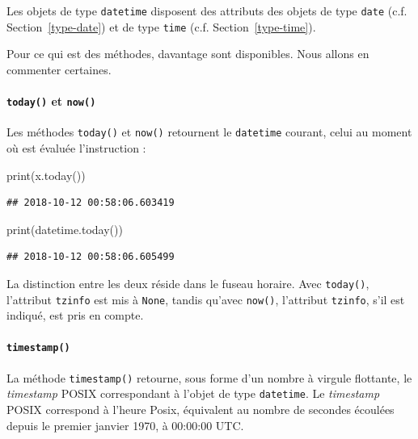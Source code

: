 \documentclass[12pt,]{book}
\newenvironment{Shaded}{\begin{snugshade}}{\end{snugshade}}
\newcommand{\BuiltInTok}[1]{#1}
\newcommand{\NormalTok}[1]{#1}
\let\oldparagraph\paragraph
\renewcommand{\paragraph}[1]{\oldparagraph{#1}\mbox{}}
\numberwithin{equation}{section}
\numberwithin{countremarque}{section}
\begin{document}
Les objets de type \texttt{datetime} disposent des attributs des objets
de type \texttt{date} (c.f. Section~\ref{type-date}) et de type
\texttt{time} (c.f. Section~\ref{type-time}).

Pour ce qui est des méthodes, davantage sont disponibles. Nous allons en
commenter certaines.

\paragraph{\texorpdfstring{\texttt{today()} et
\texttt{now()}}{today() et now()}}\label{today-et-now}

Les méthodes \texttt{today()} et \texttt{now()} retournent le
\texttt{datetime} courant, celui au moment où est évaluée l'instruction
:

\begin{Shaded}
\begin{Highlighting}[]
\BuiltInTok{print}\NormalTok{(x.today())}
\end{Highlighting}
\end{Shaded}

\begin{lstlisting}
## 2018-10-12 00:58:06.603419
\end{lstlisting}

\begin{Shaded}
\begin{Highlighting}[]
\BuiltInTok{print}\NormalTok{(datetime.today())}
\end{Highlighting}
\end{Shaded}

\begin{lstlisting}
## 2018-10-12 00:58:06.605499
\end{lstlisting}

La distinction entre les deux réside dans le fuseau horaire. Avec
\texttt{today()}, l'attribut \texttt{tzinfo} est mis à \texttt{None},
tandis qu'avec \texttt{now()}, l'attribut \texttt{tzinfo}, s'il est
indiqué, est pris en compte.

\paragraph{\texorpdfstring{\texttt{timestamp()}}{timestamp()}}\label{timestamp}

La méthode \texttt{timestamp()} retourne, sous forme d'un nombre à
virgule flottante, le \emph{timestamp} POSIX correspondant à l'objet de
type \texttt{datetime}. Le \emph{timestamp} POSIX correspond à l'heure
Posix, équivalent au nombre de secondes écoulées depuis le premier
janvier 1970, à 00:00:00 UTC.
\end{document}
